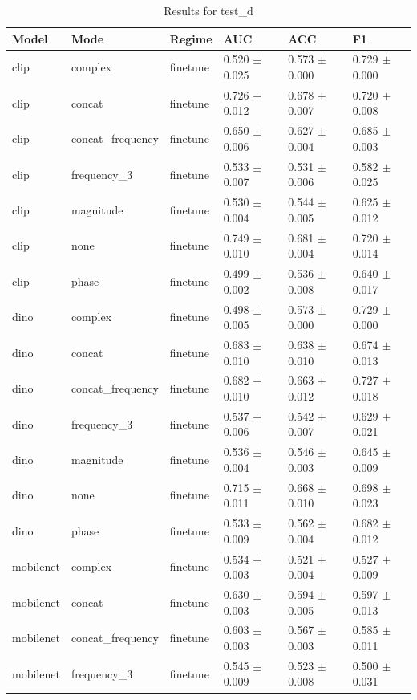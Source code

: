 \begin{table}
\caption{Results for test_d}
\label{tab:results_test_d}
\begin{tabular}{llllll}
\toprule
Model & Mode & Regime & AUC & ACC & F1 \\
\midrule
clip & complex & finetune & 0.520 $\pm$ 0.025 & 0.573 $\pm$ 0.000 & 0.729 $\pm$ 0.000 \\
clip & concat & finetune & 0.726 $\pm$ 0.012 & 0.678 $\pm$ 0.007 & 0.720 $\pm$ 0.008 \\
clip & concat_frequency & finetune & 0.650 $\pm$ 0.006 & 0.627 $\pm$ 0.004 & 0.685 $\pm$ 0.003 \\
clip & frequency_3 & finetune & 0.533 $\pm$ 0.007 & 0.531 $\pm$ 0.006 & 0.582 $\pm$ 0.025 \\
clip & magnitude & finetune & 0.530 $\pm$ 0.004 & 0.544 $\pm$ 0.005 & 0.625 $\pm$ 0.012 \\
clip & none & finetune & 0.749 $\pm$ 0.010 & 0.681 $\pm$ 0.004 & 0.720 $\pm$ 0.014 \\
clip & phase & finetune & 0.499 $\pm$ 0.002 & 0.536 $\pm$ 0.008 & 0.640 $\pm$ 0.017 \\
dino & complex & finetune & 0.498 $\pm$ 0.005 & 0.573 $\pm$ 0.000 & 0.729 $\pm$ 0.000 \\
dino & concat & finetune & 0.683 $\pm$ 0.010 & 0.638 $\pm$ 0.010 & 0.674 $\pm$ 0.013 \\
dino & concat_frequency & finetune & 0.682 $\pm$ 0.010 & 0.663 $\pm$ 0.012 & 0.727 $\pm$ 0.018 \\
dino & frequency_3 & finetune & 0.537 $\pm$ 0.006 & 0.542 $\pm$ 0.007 & 0.629 $\pm$ 0.021 \\
dino & magnitude & finetune & 0.536 $\pm$ 0.004 & 0.546 $\pm$ 0.003 & 0.645 $\pm$ 0.009 \\
dino & none & finetune & 0.715 $\pm$ 0.011 & 0.668 $\pm$ 0.010 & 0.698 $\pm$ 0.023 \\
dino & phase & finetune & 0.533 $\pm$ 0.009 & 0.562 $\pm$ 0.004 & 0.682 $\pm$ 0.012 \\
mobilenet & complex & finetune & 0.534 $\pm$ 0.003 & 0.521 $\pm$ 0.004 & 0.527 $\pm$ 0.009 \\
mobilenet & concat & finetune & 0.630 $\pm$ 0.003 & 0.594 $\pm$ 0.005 & 0.597 $\pm$ 0.013 \\
mobilenet & concat_frequency & finetune & 0.603 $\pm$ 0.003 & 0.567 $\pm$ 0.003 & 0.585 $\pm$ 0.011 \\
mobilenet & frequency_3 & finetune & 0.545 $\pm$ 0.009 & 0.523 $\pm$ 0.008 & 0.500 $\pm$ 0.031 \\

\end{tabular}
\end{table}
